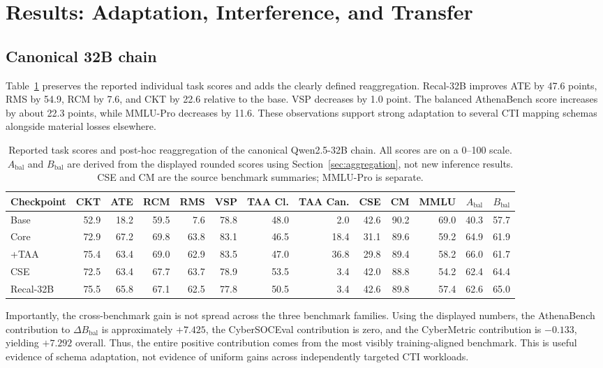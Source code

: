 \documentclass[journal]{IEEEtran}
\begin{document}
\section{Results: Adaptation, Interference, and Transfer}\label{sec:results}
\subsection{Canonical 32B chain}
Table~\ref{tab:stage} preserves the reported individual task scores and adds the clearly defined reaggregation. Recal-32B improves ATE by 47.6 points, RMS by 54.9, RCM by 7.6, and CKT by 22.6 relative to the base. VSP decreases by 1.0 point. The balanced AthenaBench score increases by about 22.3 points, while MMLU-Pro decreases by 11.6. These observations support strong adaptation to several CTI mapping schemas alongside material losses elsewhere.

\begin{table}[!t]
\centering\scriptsize
\caption{Reported task scores and post-hoc reaggregation of the canonical Qwen2.5-32B chain. All scores are on a 0--100 scale. $A_{\mathrm{bal}}$ and $B_{\mathrm{bal}}$ are derived from the displayed rounded scores using Section~\ref{sec:aggregation}, not new inference results. CSE and CM are the source benchmark summaries; MMLU-Pro is separate.}\label{tab:stage}
\setlength{\tabcolsep}{4.3pt}
\begin{tabular}{@{}lrrrrrrrrrrrr@{}}
\toprule Checkpoint & CKT & ATE & RCM & RMS & VSP & TAA Cl. & TAA Can. & CSE & CM & MMLU & $A_{\mathrm{bal}}$ & $B_{\mathrm{bal}}$ \\\midrule
Base & 52.9 & 18.2 & 59.5 & 7.6 & 78.8 & 48.0 & 2.0 & 42.6 & 90.2 & 69.0 & 40.3 & 57.7 \\
Core & 72.9 & 67.2 & 69.8 & 63.8 & 83.1 & 46.5 & 18.4 & 31.1 & 89.6 & 59.2 & 64.9 & 61.9 \\
+TAA & 75.4 & 63.4 & 69.0 & 62.9 & 83.5 & 47.0 & 36.8 & 29.8 & 89.4 & 58.2 & 66.0 & 61.7 \\
CSE & 72.5 & 63.4 & 67.7 & 63.7 & 78.9 & 53.5 & 3.4 & 42.0 & 88.8 & 54.2 & 62.4 & 64.4 \\
Recal-32B & 75.5 & 65.8 & 67.1 & 62.5 & 77.8 & 50.5 & 3.4 & 42.6 & 89.8 & 57.4 & 62.6 & 65.0 \\\bottomrule
\end{tabular}
\end{table}

Importantly, the cross-benchmark gain is not spread across the three benchmark families. Using the displayed numbers, the AthenaBench contribution to $\Delta B_{\mathrm{bal}}$ is approximately $+7.425$, the CyberSOCEval contribution is zero, and the CyberMetric contribution is $-0.133$, yielding $+7.292$ overall. Thus, the entire positive contribution comes from the most visibly training-aligned benchmark. This is useful evidence of schema adaptation, not evidence of uniform gains across independently targeted CTI workloads.
\end{document}
